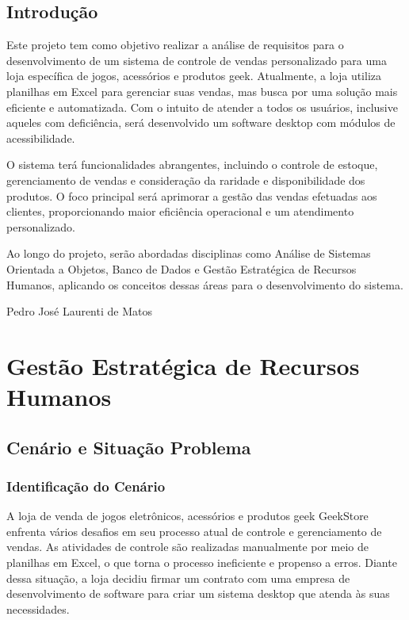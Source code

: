 \documentclass[
	12pt,				%
	openright,			%
	twoside,			%
	a4paper,			%
	english,			%
	brazil				%
	]{abntex2}
\begin{document}
\chapter{Introdução}

Este projeto tem como objetivo realizar a análise de requisitos para o desenvolvimento de um sistema de controle de vendas personalizado para uma loja específica de jogos, acessórios e produtos geek. Atualmente, a loja utiliza planilhas em Excel para gerenciar suas vendas, mas busca por uma solução mais eficiente e automatizada. Com o intuito de atender a todos os usuários, inclusive aqueles com deficiência, será desenvolvido um software desktop com módulos de acessibilidade.

O sistema terá funcionalidades abrangentes, incluindo o controle de estoque, gerenciamento de vendas e consideração da raridade e disponibilidade dos produtos. O foco principal será aprimorar a gestão das vendas efetuadas aos clientes, proporcionando maior eficiência operacional e um atendimento personalizado.

Ao longo do projeto, serão abordadas disciplinas como Análise de Sistemas Orientada a Objetos, Banco de Dados e Gestão Estratégica de Recursos Humanos, aplicando os conceitos dessas áreas para o desenvolvimento do sistema.

Pedro José Laurenti de Matos

\part{Gestão Estratégica de Recursos Humanos}



\chapter{Cenário e Situação Problema}\label{ident_cenar_problem}

\section{Identificação do Cenário}
A loja de venda de jogos eletrônicos, acessórios e produtos geek GeekStore enfrenta vários desafios em seu processo atual de controle e gerenciamento de vendas. As atividades de controle são realizadas manualmente por meio de planilhas em Excel, o que torna o processo ineficiente e propenso a erros. Diante dessa situação, a loja decidiu firmar um contrato com uma empresa de desenvolvimento de software para criar um sistema desktop que atenda às suas necessidades.
\end{document}
